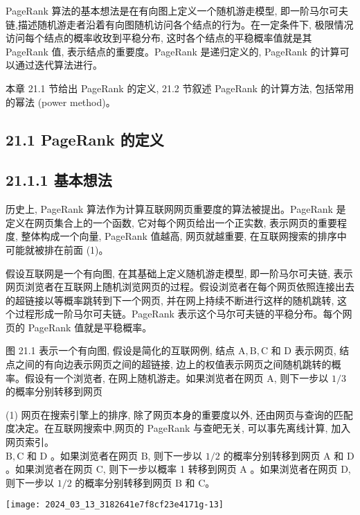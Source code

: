 \documentclass[10pt]{article}
\begin{document}
\begin{CJK*}{UTF8}{bsmi}
PageRank 算法的基本想法是在有向图上定义一个随机游走模型, 即一阶马尔可夫链,描述随机游走者沿着有向图随机访问各个结点的行为。在一定条件下, 极限情况访问每个结点的概率收玫到平稳分布, 这时各个结点的平稳概率值就是其 PageRank 值, 表示结点的重要度。PageRank 是递归定义的, PageRank 的计算可以通过迭代算法进行。

本章 21.1 节给出 PageRank 的定义, 21.2 节叙述 PageRank 的计算方法, 包括常用的幂法 (power method)。

\subsection*{21.1 PageRank 的定义}
\subsection*{21.1.1 基本想法}
历史上, PageRank 算法作为计算互联网网页重要度的算法被提出。PageRank 是定义在网页集合上的一个函数, 它对每个网页给出一个正实数, 表示网页的重要程度, 整体构成一个向量, PageRank 值越高, 网页就越重要, 在互联网搜索的排序中可能就被排在前面 (1)。

假设互联网是一个有向图, 在其基础上定义随机游走模型, 即一阶马尔可夫链, 表示网页浏览者在互联网上随机浏览网页的过程。假设浏览者在每个网页依照连接出去的超链接以等概率跳转到下一个网页, 并在网上持续不断进行这样的随机跳转, 这个过程形成一阶马尔可夫链。PageRank 表示这个马尔可夫链的平稳分布。每个网页的 PageRank 值就是平稳概率。

图 21.1 表示一个有向图, 假设是简化的互联网例, 结点 $\mathrm{A}, \mathrm{B}, \mathrm{C}$ 和 D 表示网页, 结点之间的有向边表示网页之间的超链接, 边上的权值表示网页之间随机跳转的概率。假设有一个浏览者, 在网上随机游走。如果浏览者在网页 $\mathrm{A}$, 则下一步以 $1 / 3$ 的概率分别转移到网页

(1) 网页在搜索引擎上的排序, 除了网页本身的重要度以外, 还由网页与查询的匹配度决定。在互联网搜索中,网页的 PageRank 与查皅无关, 可以事先离线计算, 加入网页索引。\\
$\mathrm{B}, \mathrm{C}$ 和 $\mathrm{D}$ 。如果浏览者在网页 $\mathrm{B}$, 则下一步以 $1 / 2$ 的概率分别转移到网页 $\mathrm{A}$ 和 $\mathrm{D}$ 。如果浏览者在网页 $\mathrm{C}$, 则下一步以概率 1 转移到网页 $\mathrm{A}$ 。如果浏览者在网页 $\mathrm{D}$, 则下一步以 $1 / 2$ 的概率分别转移到网页 $\mathrm{B}$ 和 C。

\begin{center}
\texttt{[image: 2024\_03\_13\_3182641e7f8cf23e4171g-13]}
\end{center}


\end{CJK*}
\end{document}
